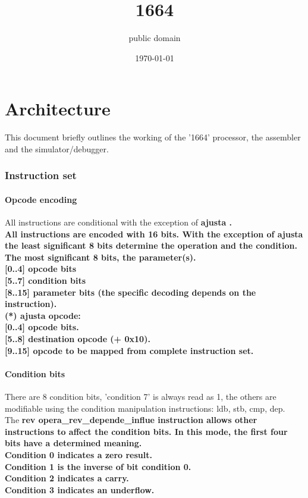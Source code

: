 \documentclass[a4paper,11pt]{article}
\begin{document}
\title{1664}
\author{public domain}
\date{\today}
\maketitle
\tableofcontents
\pagebreak

\part{Architecture}
This document briefly outlines the working of the '1664' processor, the assembler and the simulator/debugger.

\section{Instruction set}

\subsection{Opcode encoding}
All instructions are conditional with the exception of \bf ajusta \rm.\\
All instructions are encoded with 16 bits. With the exception of \bf ajusta \rm the least significant 8 bits determine the operation and the condition. The most significant 8 bits, the parameter(s). \\

[0..4] opcode bits \\

[5..7] condition bits \\

[8..15] parameter bits (the specific decoding depends on the instruction). \\

(*) \bf ajusta \rm opcode: \\

[0..4] opcode bits. \\

[5..8] destination opcode (+ 0x10).\\

[9..15] opcode to be mapped from complete instruction set. \\

\subsection{Condition bits}
There are 8 condition bits, 'condition 7' is always read as 1, the others are modifiable using the condition manipulation instructions: ldb, stb, cmp, dep. \\
The \bf rev opera\_rev\_depende\_influe \rm instruction allows other instructions to affect the condition bits. In this mode, the first four bits have a determined meaning. \\
Condition 0 indicates a zero result. \\
Condition 1 is the inverse of bit condition 0. \\
Condition 2 indicates a carry. \\
Condition 3 indicates an underflow. \\
\end{document}
